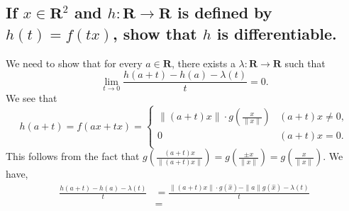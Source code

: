 \begin{parts}
    \part{
        If $x\in \mathbf{R}^2$ and
        $h:\mathbf{R}\to\mathbf{R}
        $ is defined by $h(t)=f(tx)$, show that $h$ is
        differentiable.
    }

    \begin{solution}
        We need to show that for every $a\in \mathbf{R}$,
        there
        exists a $\lambda:\mathbf{R}\to\mathbf{R}$
        such that
        \begin{equation}
            \lim_{t\to 0}
            {\frac{h(a+t)-h(a)-\lambda(t)}{t}} = 0.
        \end{equation}
        We see that
        $$h(a+t)=f(ax+tx)=
        \begin{cases}
            \|(a+t)x\|\cdot g\left(\frac{x}
            {\|x\|}\right) & (a+t)x\neq 0,\\
            0 & (a+t)x=0.\\
        \end{cases}$$
        This follows from the fact that
        $g\left(\frac{(a+t)x}
        {\|(a+t)x\|}\right)=g\left(\frac{\pm x}{\|x\|}\right)
        =g\left(\frac{x}{\|x\|}\right).$ We have,
        \begin{align*}
            \frac{h(a+t)-h(a)-\lambda(t)}{t} & =
            \frac{\|(a+t)x\|\cdot g(\hat{x})-\|a\|g
            (\hat{x})-\lambda(t)}
            {t}\\
            & = 
        \end{align*}
    \end{solution}
\end{parts}